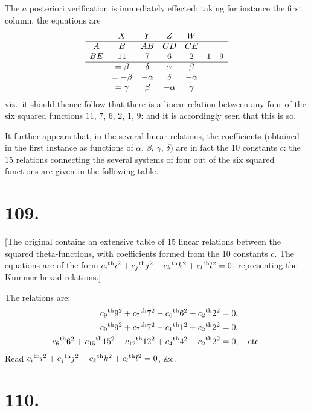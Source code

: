 \documentclass[11pt,a4paper]{book}
\providecommand{\uth}{\textsuperscript{th}}
\begin{document}
The $a$ posteriori verification is immediately effected; taking for instance the first column, the equations are
\[
\begin{array}{ccccccc}
& X & Y & Z & W & & \\
\hline
A & B & AB & CD & CE & & \\
BE & 11 & 7 & 6 & 2 & 1 & 9 \\
\hline
& = \beta & \delta & \gamma & \beta & & \\
& = -\beta & -\alpha & \delta & -\alpha & & \\
& = \gamma & \beta & -\alpha & \gamma & &
\end{array}
\]
viz.\ it should thence follow that there is a linear relation between any four of the six squared functions $11$, $7$, $6$, $2$, $1$, $9$: and it is accordingly seen that this is so.

It further appears that, in the several linear relations, the coefficients (obtained in the first instance as functions of $\alpha$, $\beta$, $\gamma$, $\delta$) are in fact the 10 constants $c$: the 15 relations connecting the several systems of four out of the six squared functions are given in the following table.

\newpage
\section*{109.}
\label{sec:109}

[The original contains an extensive table of 15 linear relations between the squared theta-functions, with coefficients formed from the 10 constants $c$. The equations are of the form $c_i\uth{i}^2 + c_j\uth{j}^2 - c_k\uth{k}^2 + c_l\uth{l}^2 = 0$, representing the Kummer hexad relations.]

The relations are:
\begin{align*}
c_9\uth{9}^2 + c_7\uth{7}^2 - c_6\uth{6}^2 + c_2\uth{2}^2 &= 0, \\
c_9\uth{9}^2 + c_7\uth{7}^2 - c_1\uth{1}^2 + c_2\uth{2}^2 &= 0, \\
c_6\uth{6}^2 + c_{15}\uth{15}^2 - c_{12}\uth{12}^2 + c_4\uth{4}^2 - c_2\uth{2}^2 &= 0, \quad \text{etc.}
\end{align*}
Read $c_i\uth{i}^2 + c_j\uth{j}^2 - c_k\uth{k}^2 + c_l\uth{l}^2 = 0$, \&c.

\newpage
\section*{110.}
\label{sec:110}
\end{document}
